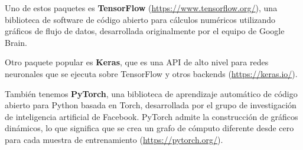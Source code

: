 Uno de estos paquetes es \textbf{TensorFlow} (\url{https://www.tensorflow.org/}), una biblioteca de software de código abierto para cálculos numéricos utilizando gráficos de flujo de datos, desarrollada originalmente por el equipo de Google Brain.

Otro paquete popular es \textbf{Keras}, que es una API de alto nivel para redes neuronales que se ejecuta sobre TensorFlow y otros backends (\url{https://keras.io/}).

También tenemos \textbf{PyTorch}, una biblioteca de aprendizaje automático de código abierto para Python basada en Torch, desarrollada por el grupo de investigación de inteligencia artificial de Facebook. PyTorch admite la construcción de gráficos dinámicos, lo que significa que se crea un grafo de cómputo diferente desde cero para cada muestra de entrenamiento (\url{https://pytorch.org/}).

